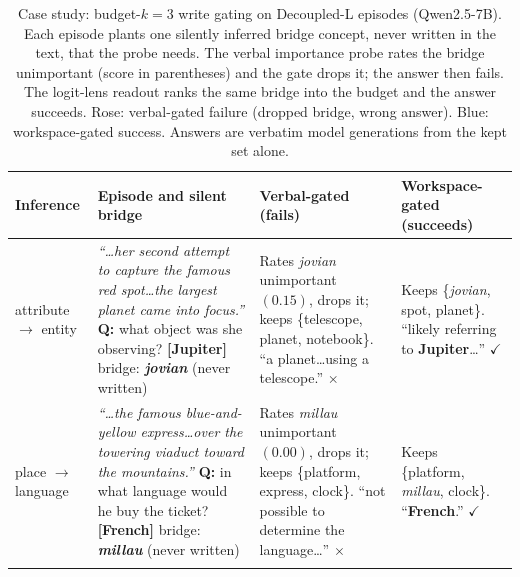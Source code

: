 \begin{table}[t]
\centering
\caption{Case study: budget-$k{=}3$ write gating on Decoupled-L episodes
(Qwen2.5-7B). Each episode plants one silently inferred bridge concept, never
written in the text, that the probe needs. The verbal importance probe rates
the bridge unimportant (score in parentheses) and the gate drops it;
the answer then fails. The logit-lens readout ranks the same bridge into the
budget and the answer succeeds. \textcolor{failorange}{Rose}: verbal-gated
failure (dropped bridge, wrong answer). \textcolor{wsblue}{Blue}:
workspace-gated success. Answers are verbatim model generations from the
kept set alone.}
\label{tab:casestudy}
\small
\setlength{\tabcolsep}{5pt}
\renewcommand{\arraystretch}{1.15}
\begin{tabular}{@{}p{}p{}p{}p{}@{}}
\toprule
\textbf{Inference} & \textbf{Episode and silent bridge} &
\textbf{\textcolor{failorange}{Verbal-gated (fails)}} &
\textbf{\textcolor{wsblue}{Workspace-gated (succeeds)}} \\
\midrule

attribute\newline $\rightarrow$ entity &
\emph{``\ldots her second attempt to capture the famous red spot\ldots the
largest planet came into focus.''}\newline
\textbf{Q:} what object was she observing? \textbf{[Jupiter]}\newline
bridge: \textbf{\emph{jovian}} (never written) &
\textcolor{failorange}{Rates \emph{jovian} unimportant $(0.15)$, drops it;
keeps \{telescope, planet, notebook\}.}\newline
\textcolor{failorange}{``a planet\ldots using a telescope.'' $\times$} &
\textcolor{wsblue}{Keeps \{\emph{jovian}, spot, planet\}.}\newline
\textcolor{wsblue}{``likely referring to \textbf{Jupiter}\ldots'' $\checkmark$} \\
\addlinespace

place $\rightarrow$\newline language &
\emph{``\ldots the famous blue-and-yellow express\ldots over the towering
viaduct toward the mountains.''}\newline
\textbf{Q:} in what language would he buy the ticket? \textbf{[French]}\newline
bridge: \textbf{\emph{millau}} (never written) &
\textcolor{failorange}{Rates \emph{millau} unimportant $(0.00)$, drops it;
keeps \{platform, express, clock\}.}\newline
\textcolor{failorange}{``not possible to determine the language\ldots'' $\times$} &
\textcolor{wsblue}{Keeps \{platform, \emph{millau}, clock\}.}\newline
\textcolor{wsblue}{``\textbf{French}.'' $\checkmark$} \\
\addlinespace


\end{tabular}
\end{table}
